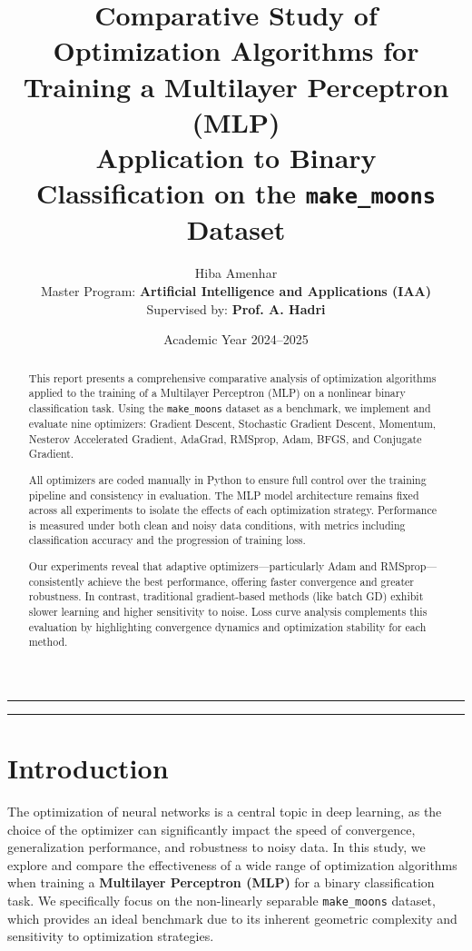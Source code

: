 \documentclass[12pt]{article}
\title{Comparative Study of Optimization Algorithms for Training a Multilayer Perceptron (MLP)\\[0.5em]
\large \textbf{Application to Binary Classification on the \texttt{make\_moons} Dataset}}
\author{
Hiba Amenhar \\[0.3em]
\small Master Program: \textbf{Artificial Intelligence and Applications (IAA)} \\[0.3em]
\small Supervised by: \textbf{Prof. A. Hadri}
}
\date{Academic Year 2024--2025}
\begin{document}
\maketitle

\vspace{-1em}
\begin{center}
\rule{0.85\textwidth}{0.5pt}
\end{center}

\vspace{1em}
\begin{abstract}
\noindent
This report presents a comprehensive comparative analysis of optimization algorithms applied to the training of a Multilayer Perceptron (MLP) on a nonlinear binary classification task. Using the \texttt{make\_moons} dataset as a benchmark, we implement and evaluate nine optimizers: Gradient Descent, Stochastic Gradient Descent, Momentum, Nesterov Accelerated Gradient, AdaGrad, RMSprop, Adam, BFGS, and Conjugate Gradient.

All optimizers are coded manually in Python to ensure full control over the training pipeline and consistency in evaluation. The MLP model architecture remains fixed across all experiments to isolate the effects of each optimization strategy. Performance is measured under both clean and noisy data conditions, with metrics including classification accuracy and the progression of training loss.

Our experiments reveal that adaptive optimizers—particularly Adam and RMSprop—consistently achieve the best performance, offering faster convergence and greater robustness. In contrast, traditional gradient-based methods (like batch GD) exhibit slower learning and higher sensitivity to noise. Loss curve analysis complements this evaluation by highlighting convergence dynamics and optimization stability for each method.
\end{abstract}

\vspace{1em}
\begin{center}
\rule{0.85\textwidth}{0.5pt}
\end{center}

\tableofcontents
\newpage
{}
\newpage

\section{Introduction}

The optimization of neural networks is a central topic in deep learning, as the choice of the optimizer can significantly impact the speed of convergence, generalization performance, and robustness to noisy data. In this study, we explore and compare the effectiveness of a wide range of optimization algorithms when training a \textbf{Multilayer Perceptron (MLP)} for a binary classification task. We specifically focus on the non-linearly separable \texttt{make\_moons} dataset, which provides an ideal benchmark due to its inherent geometric complexity and sensitivity to optimization strategies.
\end{document}
